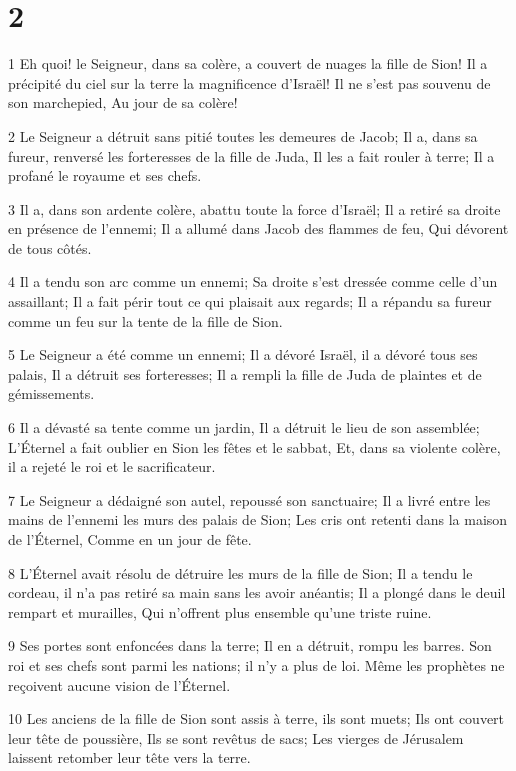 \chapter{2}

\par 1 Eh quoi! le Seigneur, dans sa colère, a couvert de nuages la fille de Sion! Il a précipité du ciel sur la terre la magnificence d'Israël! Il ne s'est pas souvenu de son marchepied, Au jour de sa colère!
\par 2 Le Seigneur a détruit sans pitié toutes les demeures de Jacob; Il a, dans sa fureur, renversé les forteresses de la fille de Juda, Il les a fait rouler à terre; Il a profané le royaume et ses chefs.
\par 3 Il a, dans son ardente colère, abattu toute la force d'Israël; Il a retiré sa droite en présence de l'ennemi; Il a allumé dans Jacob des flammes de feu, Qui dévorent de tous côtés.
\par 4 Il a tendu son arc comme un ennemi; Sa droite s'est dressée comme celle d'un assaillant; Il a fait périr tout ce qui plaisait aux regards; Il a répandu sa fureur comme un feu sur la tente de la fille de Sion.
\par 5 Le Seigneur a été comme un ennemi; Il a dévoré Israël, il a dévoré tous ses palais, Il a détruit ses forteresses; Il a rempli la fille de Juda de plaintes et de gémissements.
\par 6 Il a dévasté sa tente comme un jardin, Il a détruit le lieu de son assemblée; L'Éternel a fait oublier en Sion les fêtes et le sabbat, Et, dans sa violente colère, il a rejeté le roi et le sacrificateur.
\par 7 Le Seigneur a dédaigné son autel, repoussé son sanctuaire; Il a livré entre les mains de l'ennemi les murs des palais de Sion; Les cris ont retenti dans la maison de l'Éternel, Comme en un jour de fête.
\par 8 L'Éternel avait résolu de détruire les murs de la fille de Sion; Il a tendu le cordeau, il n'a pas retiré sa main sans les avoir anéantis; Il a plongé dans le deuil rempart et murailles, Qui n'offrent plus ensemble qu'une triste ruine.
\par 9 Ses portes sont enfoncées dans la terre; Il en a détruit, rompu les barres. Son roi et ses chefs sont parmi les nations; il n'y a plus de loi. Même les prophètes ne reçoivent aucune vision de l'Éternel.
\par 10 Les anciens de la fille de Sion sont assis à terre, ils sont muets; Ils ont couvert leur tête de poussière, Ils se sont revêtus de sacs; Les vierges de Jérusalem laissent retomber leur tête vers la terre.
